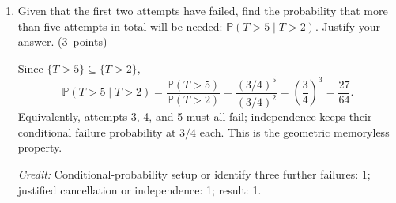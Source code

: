 \documentclass[11pt,letterpaper]{article}
\newcommand{\Prob}{\mathbb P}
\newcommand{\partpts}[1]{\unskip\nobreak\hspace{.3em}%
  \mbox{\small\color{muted}(#1 points)}}
\newcommand{\credit}[1]{\par{\footnotesize\color{muted}\textit{Credit:} #1}}
\begin{document}
\begin{enumerate}
  \item Given that the first two attempts have failed, find the probability
  that more than five attempts in total will be needed:
  $\Prob(T>5\mid T>2)$. Justify your answer. \partpts{3}
  \begin{solution}[1.05in]
    Since $\{T>5\}\subseteq\{T>2\}$,
    \[
      \Prob(T>5\mid T>2)=\frac{\Prob(T>5)}{\Prob(T>2)}
        =\frac{(3/4)^5}{(3/4)^2}
        =\left(\frac34\right)^3=\frac{27}{64}.
    \]
    Equivalently, attempts 3, 4, and 5 must all fail; independence keeps
    their conditional failure probability at $3/4$ each. This is the
    geometric memoryless property.
    \credit{Conditional-probability setup or identify three further
    failures: 1; justified cancellation or independence: 1; result: 1.}
  \end{solution}
\end{enumerate}

\label{quiz-last-page}
\end{document}
